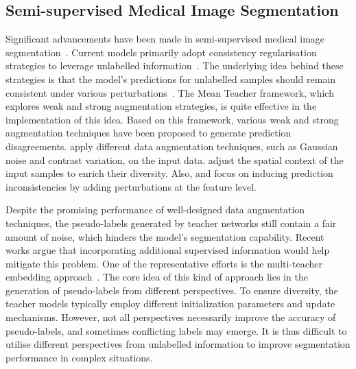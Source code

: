 \subsection{Semi-supervised Medical Image Segmentation}

Significant advancements have been made in semi-supervised medical image segmentation~\citep{miao2023caussl, wang2023mcf}. Current models primarily adopt consistency regularisation strategies to leverage unlabelled information~\citep{hang2020local, wang2020double}. The underlying idea behind these strategies is that the model's predictions for unlabelled samples should remain consistent under various perturbations~\citep{bai2023bidirectional, gao2023correlation}. The Mean Teacher framework, which explores weak and strong augmentation strategies, is quite effective in the implementation of this idea. Based on this framework, various weak and strong augmentation techniques have been proposed to generate prediction disagreements. \citet{li2020transformation} apply different data augmentation techniques, such as Gaussian noise and contrast variation, on the input data. \citet{liu2022translation} adjust the spatial context of the input samples to enrich their diversity. Also, \citet{xu2022learning} and \citet{zheng2022double} focus on inducing prediction inconsistencies by adding perturbations at the feature level.


Despite the promising performance of well-designed data augmentation techniques, the pseudo-labels generated by teacher networks still contain a fair amount of noise, which hinders the model's segmentation capability. Recent works argue that incorporating additional supervised information would help mitigate this problem. One of the representative efforts is the multi-teacher embedding approach~\citep{liu2022perturbed, zhao2023alternate}. The core idea of this kind of approach lies in the generation of pseudo-labels from different perspectives. To ensure diversity, the teacher models typically employ different initialization parameters and update mechanisms. However, not all perspectives necessarily improve the accuracy of pseudo-labels, and sometimes conflicting labels may emerge. It is thus difficult to utilise different perspectives from unlabelled information to improve segmentation performance in complex situations. 


